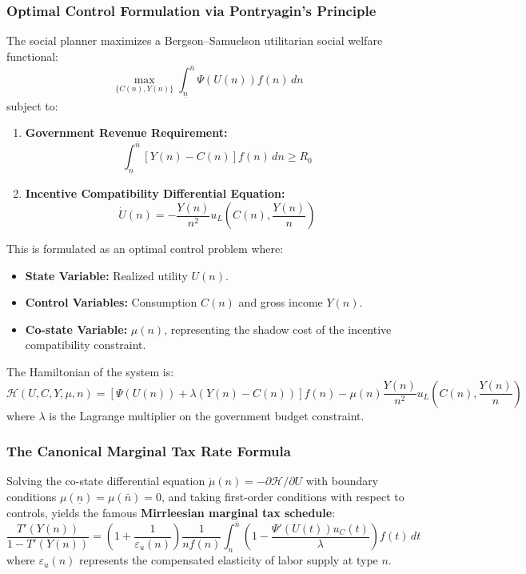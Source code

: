 \documentclass[11pt,a4paper]{article}
\begin{document}
\subsubsection{Optimal Control Formulation via Pontryagin's Principle}
The social planner maximizes a Bergson--Samuelson utilitarian social welfare functional:
\begin{equation}
\max_{\{C(n), Y(n)\}} \int_{\underline{n}}^{\bar{n}} \Psi(U(n)) f(n) \, dn
\end{equation}
subject to:
\begin{enumerate}
    \item \textbf{Government Revenue Requirement:}
    \begin{equation}
    \int_{\underline{n}}^{\bar{n}} \left[ Y(n) - C(n) \right] f(n) \, dn \ge R_0
    \end{equation}
    \item \textbf{Incentive Compatibility Differential Equation:}
    \begin{equation}
    \dot{U}(n) = - \frac{Y(n)}{n^2} u_L\left(C(n), \frac{Y(n)}{n}\right)
    \end{equation}
\end{enumerate}
This is formulated as an optimal control problem where:
\begin{itemize}
    \item \textbf{State Variable:} Realized utility $U(n)$.
    \item \textbf{Control Variables:} Consumption $C(n)$ and gross income $Y(n)$.
    \item \textbf{Co-state Variable:} $\mu(n)$, representing the shadow cost of the incentive compatibility constraint.
\end{itemize}

The Hamiltonian of the system is:
\begin{equation}
\mathcal{H}(U, C, Y, \mu, n) = \left[ \Psi(U(n)) + \lambda (Y(n) - C(n)) \right] f(n) - \mu(n) \frac{Y(n)}{n^2} u_L\left(C(n), \frac{Y(n)}{n}\right)
\end{equation}
where $\lambda$ is the Lagrange multiplier on the government budget constraint.

\subsubsection{The Canonical Marginal Tax Rate Formula}
Solving the co-state differential equation $\dot{\mu}(n) = -\partial \mathcal{H} / \partial U$ with boundary conditions $\mu(\underline{n}) = \mu(\bar{n}) = 0$, and taking first-order conditions with respect to controls, yields the famous \textbf{Mirrleesian marginal tax schedule}:
\begin{equation}
\frac{T'(Y(n))}{1 - T'(Y(n))} = \left( 1 + \frac{1}{\varepsilon_u(n)} \right) \frac{1}{n f(n)} \int_n^{\bar{n}} \left( 1 - \frac{\Psi'(U(t)) u_C(t)}{\lambda} \right) f(t) \, dt
\end{equation}
where $\varepsilon_u(n)$ represents the compensated elasticity of labor supply at type $n$.
\end{document}
